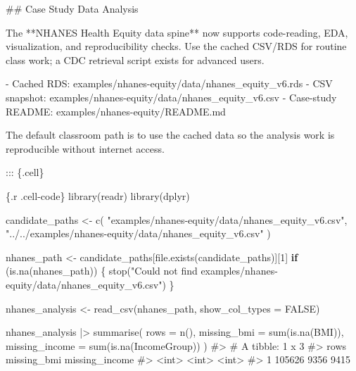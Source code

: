 \documentclass[
  letterpaper,
  DIV=11,
  numbers=noendperiod,
  oneside]{scrreprt}
\newenvironment{Shaded}{\begin{snugshade}}{\end{snugshade}}
\newcommand{\AttributeTok}[1]{\textcolor[rgb]{0.40,0.45,0.13}{#1}}
\newcommand{\CommentTok}[1]{\textcolor[rgb]{0.37,0.37,0.37}{#1}}
\newcommand{\ConstantTok}[1]{\textcolor[rgb]{0.56,0.35,0.01}{#1}}
\newcommand{\ControlFlowTok}[1]{\textcolor[rgb]{0.00,0.23,0.31}{\textbf{#1}}}
\newcommand{\DecValTok}[1]{\textcolor[rgb]{0.68,0.00,0.00}{#1}}
\newcommand{\FunctionTok}[1]{\textcolor[rgb]{0.28,0.35,0.67}{#1}}
\newcommand{\InformationTok}[1]{\textcolor[rgb]{0.37,0.37,0.37}{#1}}
\newcommand{\NormalTok}[1]{\textcolor[rgb]{0.00,0.23,0.31}{#1}}
\newcommand{\OtherTok}[1]{\textcolor[rgb]{0.00,0.23,0.31}{#1}}
\newcommand{\SpecialCharTok}[1]{\textcolor[rgb]{0.37,0.37,0.37}{#1}}
\newcommand{\SpecialStringTok}[1]{\textcolor[rgb]{0.13,0.47,0.30}{#1}}
\newcommand{\StringTok}[1]{\textcolor[rgb]{0.13,0.47,0.30}{#1}}
\begin{document}
\begin{Shaded}
\begin{Highlighting}[numbers=left,,]
\FunctionTok{\#\# Case Study Data Analysis}

\NormalTok{The **NHANES Health Equity data spine** now supports code{-}reading, EDA, visualization, and reproducibility checks. Use the cached CSV/RDS for routine class work; a CDC retrieval script exists for advanced users.}

\SpecialStringTok{{-} }\NormalTok{Cached RDS: }\InformationTok{\textasciigrave{}examples/nhanes{-}equity/data/nhanes\_equity\_v6.rds\textasciigrave{}}
\SpecialStringTok{{-} }\NormalTok{CSV snapshot: }\InformationTok{\textasciigrave{}examples/nhanes{-}equity/data/nhanes\_equity\_v6.csv\textasciigrave{}}
\SpecialStringTok{{-} }\NormalTok{Case{-}study README: }\InformationTok{\textasciigrave{}examples/nhanes{-}equity/README.md\textasciigrave{}}

\NormalTok{The default classroom path is to use the cached data so the analysis work is reproducible without internet access.}


\NormalTok{::: \{.cell\}}

\InformationTok{\textasciigrave{}\textasciigrave{}\textasciigrave{}\{.r .cell{-}code\}}
\FunctionTok{library}\NormalTok{(readr)}
\FunctionTok{library}\NormalTok{(dplyr)}

\NormalTok{candidate\_paths }\OtherTok{\textless{}{-}} \FunctionTok{c}\NormalTok{(}
  \StringTok{"examples/nhanes{-}equity/data/nhanes\_equity\_v6.csv"}\NormalTok{,}
  \StringTok{"../../examples/nhanes{-}equity/data/nhanes\_equity\_v6.csv"}
\NormalTok{)}

\NormalTok{nhanes\_path }\OtherTok{\textless{}{-}}\NormalTok{ candidate\_paths[}\FunctionTok{file.exists}\NormalTok{(candidate\_paths)][}\DecValTok{1}\NormalTok{]}
\ControlFlowTok{if}\NormalTok{ (}\FunctionTok{is.na}\NormalTok{(nhanes\_path)) \{}
  \FunctionTok{stop}\NormalTok{(}\StringTok{"Could not find examples/nhanes{-}equity/data/nhanes\_equity\_v6.csv"}\NormalTok{)}
\NormalTok{\}}

\NormalTok{nhanes\_analysis }\OtherTok{\textless{}{-}} \FunctionTok{read\_csv}\NormalTok{(nhanes\_path, }\AttributeTok{show\_col\_types =} \ConstantTok{FALSE}\NormalTok{)}

\NormalTok{nhanes\_analysis }\SpecialCharTok{|\textgreater{}}
  \FunctionTok{summarise}\NormalTok{(}
    \AttributeTok{rows =} \FunctionTok{n}\NormalTok{(),}
    \AttributeTok{missing\_bmi =} \FunctionTok{sum}\NormalTok{(}\FunctionTok{is.na}\NormalTok{(BMI)),}
    \AttributeTok{missing\_income =} \FunctionTok{sum}\NormalTok{(}\FunctionTok{is.na}\NormalTok{(IncomeGroup))}
\NormalTok{  )}
\CommentTok{\#\textgreater{} \# A tibble: 1 x 3}
\CommentTok{\#\textgreater{}     rows missing\_bmi missing\_income}
\CommentTok{\#\textgreater{}    \textless{}int\textgreater{}       \textless{}int\textgreater{}          \textless{}int\textgreater{}}
\CommentTok{\#\textgreater{} 1 105626        9356           9415}


\end{Highlighting}
\end{Shaded}
\end{document}
